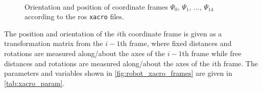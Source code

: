 \begin{figure}[htbp]
\vspace*{-10mm}
\hspace{-8mm}
%
\vspace{5mm}\\
\hspace*{-9mm}
%
\caption{Orientation and position of coordinate frames $\Psi_0$, $\Psi_1$, ..., $\Psi_{14}$ according to the \gls{ros} \texttt{xacro} files.}
\label{fig:robot_xacro_frames}
\end{figure}

The position and orientation of the $i$th coordinate frame is given as a transformation matrix from the $i-1$th frame, where fixed distances and rotations are measured along/about the axes of the $i-1$th frame while free distances and rotations are measured along/about the axes of the $i$th frame. The parameters and variables shown in \autoref{fig:robot_xacro_frames} are given in \autoref{tab:xacro_param}.

